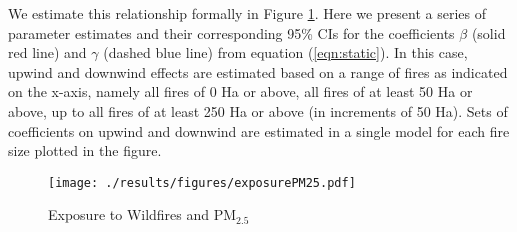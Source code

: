 \documentclass[11pt]{article}
\begin{document}
\begin{spacing}{1.5}
We estimate this relationship formally in Figure \ref{fig:firstStage}.  Here we present a series of parameter estimates and their corresponding 95\% CIs for the coefficients $\beta$ (solid red line) and $\gamma$ (dashed blue line) from equation (\ref{eqn:static}).  In this case, upwind and downwind effects are estimated based on a range of fires as indicated on the x-axis, namely all fires of 0 Ha or above, all fires of at least 50 Ha or above, up to all fires of at least 250 Ha or above (in increments of 50 Ha). Sets of coefficients on upwind and downwind are estimated in a single model for each fire size plotted in the figure.

\begin{figure}[ht!]
    \caption{Exposure to Wildfires and PM$_{2.5}$}
    \label{fig:firstStage}
    \centering
    \texttt{[image: ./results/figures/exposurePM25.pdf]}
\end{figure}



\end{spacing}
\end{document}
